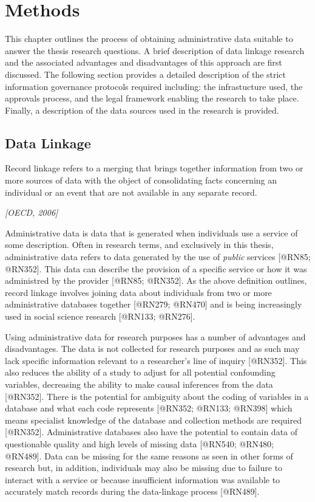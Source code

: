\documentclass[]{article}
\title{}
\author{}
\date{}
\begin{document}
\chapter{Methods}\label{ch:data}

This chapter outlines the process of obtaining administrative data
suitable to answer the thesis research questions. A brief description of
data linkage research and the associated advantages and disadvantages of
this approach are first discussed. The following section provides a
detailed description of the strict information governance protocols
required including: the infrastucture used, the approvals process, and
the legal framework enabling the research to take place. Finally, a
description of the data sources used in the research is provided.

\section{Data Linkage}\label{sec:data-linkage}

\epigraph{Record linkage refers to a merging that brings together information from two or more sources of data with the object of consolidating facts concerning an individual or an event that are not available in any separate record.}{\textit{[OECD, 2006]}}

Administrative data is data that is generated when individuals use a
service of some description. Often in research terms, and exclusively in
this thesis, administrative data refers to data generated by the use of
\textit{public} services {[}@RN85; @RN352{]}. This data can describe the
provision of a specific service or how it was administred by the
provider {[}@RN85; @RN352{]}. As the above definition outlines, record
linkage involves joining data about individuals from two or more
administrative databases together {[}@RN279; @RN470{]} and is being
increasingly used in social science research {[}@RN133; @RN276{]}.

Using administrative data for research purposes has a number of
advantages and disadvantages. The data is not collected for research
purposes and as such may lack specific information relevant to a
researcher's line of inquiry {[}@RN352{]}. This also reduces the ability
of a study to adjust for all potential confounding variables, decreasing
the ability to make causal inferences from the data {[}@RN352{]}. There
is the potential for ambiguity about the coding of variables in a
database and what each code represents {[}@RN352; @RN133; @RN398{]}
which means specialist knowledge of the database and collection methods
are required {[}@RN352{]}. Administrative databases also have the
potential to contain data of questionable quality and high levels of
missing data {[}@RN540; @RN480; @RN489{]}. Data can be missing for the
same reasons as seen in other forms of research but, in addition,
individuals may also be missing due to failure to interact with a
service or because insufficient information was available to accurately
match records during the data-linkage process {[}@RN489{]}.
\end{document}
